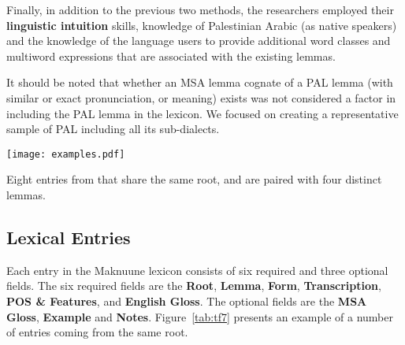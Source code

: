 Finally, in addition to the previous two methods, the researchers employed their \textbf{linguistic intuition} skills, knowledge of Palestinian Arabic (as native speakers) and the knowledge of the language users to provide additional word classes and multiword expressions that are associated with the existing lemmas.

It should be noted that whether an MSA lemma cognate of a PAL lemma (with similar or exact pronunciation, or meaning) exists was not considered a factor in including the PAL lemma in the lexicon.  We focused on creating a  representative sample of PAL including all its sub-dialects.


\begin{table*}[t!]
    \centering
\texttt{[image: examples.pdf]}
    \caption{Eight entries from {\maknuune} that share the same root, and are paired with four distinct lemmas.}
    \label{tab:tf7}
\end{table*}

\subsection*{Lexical Entries}


Each entry in the Maknuune lexicon consists of six required and three optional fields.
The six required fields are the \textbf{Root}, \textbf{Lemma}, \textbf{Form}, \textbf{Transcription},  \textbf{POS \& Features}, and \textbf{English Gloss}. The optional fields are the \textbf{MSA Gloss}, \textbf{Example} and \textbf{Notes}.
Figure~\ref{tab:tf7} presents an example of a number of entries coming from the same root.



